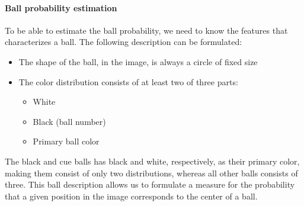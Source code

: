 \paragraph{Ball probability estimation}
To be able to estimate the ball probability, we need to know the features that characterizes a ball. The following description can be formulated:
\begin{itemize}
\item The shape of the ball, in the image, is always a circle of fixed size
\item The color distribution consists of at least two of three parts:
	\begin{itemize}
		\item White
		\item Black (ball number)
		\item Primary ball color
	\end{itemize}
\end{itemize}
The black and cue balls has black and white, respectively, as their primary color, making them consist of only two distributions, whereas all other balls consists of three. This ball description allows us to formulate a measure for the probability that a given position in the image corresponds to the center of a ball.

